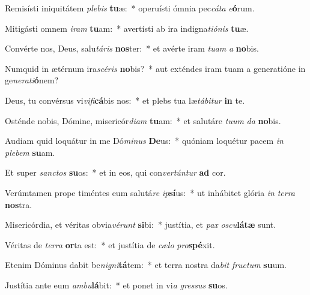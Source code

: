 \item Remisísti iniquitátem \textit{ple}\textit{bis} \textbf{tu}æ:~* operuísti ómnia pec\textit{cá}\textit{ta} \textit{e}\textbf{ó}rum.
\item Mitigásti omnem \textit{i}\textit{ram} \textbf{tu}am:~* avertísti ab ira indigna\textit{ti}\textit{ó}\textit{nis} \textbf{tu}æ.
\item Convérte nos, Deus, salu\textit{tá}\textit{ris} \textbf{nos}ter:~* et avérte iram \textit{tu}\textit{am} \textit{a} \textbf{no}bis.
\item Numquid in ætérnum ira\textit{scé}\textit{ris} \textbf{no}bis?~* aut exténdes iram tuam a generatióne in ge\textit{ne}\textit{ra}\textit{ti}\textbf{ó}nem?
\item Deus, tu convérsus vi\textit{vi}\textit{fi}\textbf{cá}bis nos:~* et plebs tua læ\textit{tá}\textit{bi}\textit{tur} \textbf{in} te.
\item Osténde nobis, Dómine, misericór\textit{di}\textit{am} \textbf{tu}am:~* et salutáre \textit{tu}\textit{um} \textit{da} \textbf{no}bis.
\item Audiam quid loquátur in me Dó\textit{mi}\textit{nus} \textbf{De}us:~* quóniam loquétur pacem \textit{in} \textit{ple}\textit{bem} \textbf{su}am.
\item Et super \textit{sanc}\textit{tos} \textbf{su}os:~* et in eos, qui con\textit{ver}\textit{tún}\textit{tur} \textbf{ad} cor.
\item Verúmtamen prope timéntes eum salutá\textit{re} \textit{ip}\textbf{sí}us:~* ut inhábitet glória \textit{in} \textit{ter}\textit{ra} \textbf{nos}tra.
\item Misericórdia, et véritas obvia\textit{vé}\textit{runt} \textbf{si}bi:~* justítia, et \textit{pax} \textit{os}\textit{cu}\textbf{lá}\textbf{tæ} sunt.
\item Véritas de \textit{ter}\textit{ra} \textbf{or}ta est:~* et justítia de \textit{cæ}\textit{lo} \textit{pro}\textbf{spé}xit.
\item Etenim Dóminus dabit be\textit{ni}\textit{gni}\textbf{tá}tem:~* et terra nostra da\textit{bit} \textit{fruc}\textit{tum} \textbf{su}um.
\item Justítia ante eum \textit{am}\textit{bu}\textbf{lá}bit:~* et ponet in vi\textit{a} \textit{gres}\textit{sus} \textbf{su}os.
